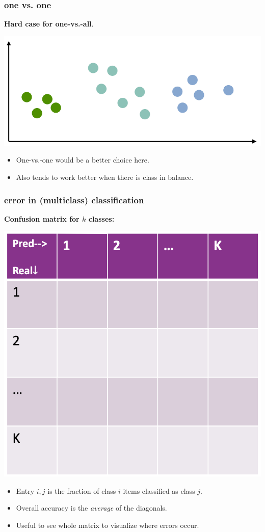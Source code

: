 \documentclass[handout,compress]{beamer}
\begin{document}
\begin{frame}
	\frametitle{one vs. one}
	\textbf{Hard case for one-vs.-all}.
	\begin{center}
		\includegraphics[width=.5\textwidth]{one_vs_hard.png}
	\end{center}
	\begin{itemize}
		\item One-vs.-one would be a better choice here. 
		\item Also tends to work better when there is class in balance.
	\end{itemize}
\end{frame}

\begin{frame}
	\frametitle{error in (multiclass) classification}
	\textbf{Confusion matrix for $k$ classes:}
	\begin{center}
		\includegraphics[width=.45\textwidth]{confusion_matrix.png}
	\end{center}
\begin{itemize}
	\small
	\item Entry $i,j$ is the fraction of class $i$ items classified as class $j$.
	\item Overall accuracy is the \emph{average} of the diagonals.
	\item Useful to see whole matrix to visualize where errors occur.
\end{itemize}
\end{frame}
\end{document}
